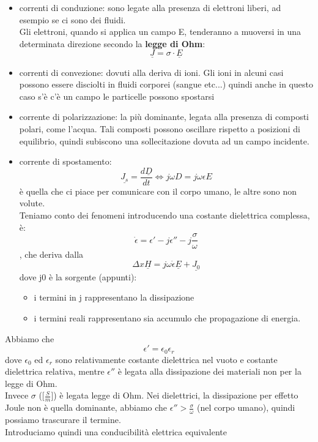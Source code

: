 \documentclass[oneside, 12pt]{extbook}
\begin{document}
\begin{itemize}
	\item correnti di conduzione: sono legate alla presenza di elettroni liberi, ad esempio se ci sono dei fluidi.\\ Gli elettroni, quando si applica un campo E, tenderanno a muoversi in una determinata direzione secondo la \textbf{legge di Ohm}:
	\begin{equation}
		\underline{J} = \sigma \cdot \underline{E}
	\end{equation}
	\item correnti di convezione: dovuti alla deriva di ioni. Gli ioni in alcuni casi possono essere disciolti in fluidi corporei (sangue etc...) quindi anche in questo caso s'è c'è un campo le particelle possono spostarsi
	\item corrente di polarizzazione: la più dominante, legata alla presenza di composti polari, come l'acqua. Tali composti possono oscillare rispetto a posizioni di equilibrio, quindi subiscono una sollecitazione dovuta ad un campo incidente.
	\item corrente di spostamento:
	\begin{equation}
		\underline{J_s} = \frac{d\underline{D}}{dt} \Leftrightarrow j\omega D = j \omega \epsilon E
	\end{equation} è quella che ci piace per comunicare con il corpo umano, le altre sono non volute.\\Teniamo conto dei fenomeni introducendo una costante dielettrica complessa, è:
	\begin{equation}
		\dot{\epsilon} = \epsilon' - j \epsilon'' - j \frac{\sigma}{\omega} 
	\end{equation}, che deriva dalla
	\begin{equation}
	\Delta x \underline{H} = j \omega \dot{\epsilon} \underline{E} + \underline{J_0}
	\end{equation}
	dove j0 è la sorgente (appunti):
	\begin{itemize}
		\item i termini in j rappresentano la dissipazione 
		\item i termini reali rappresentano sia accumulo che propagazione di energia.
	\end{itemize} 
\end{itemize}
Abbiamo che 
\begin{equation}
	\epsilon' = \epsilon_0 \epsilon_r	
\end{equation}
dove $\epsilon_0$ ed $\epsilon_r$ sono relativamente costante dielettrica nel vuoto e costante dielettrica relativa, mentre $\epsilon ''$ è legata alla dissipazione dei materiali non per la legge di Ohm.\\Invece $\sigma$ ([$\frac{S}{m}$]) è legata legge di Ohm. Nei dielettrici, la dissipazione per effetto Joule non è quella dominante, abbiamo che $\epsilon'' > \frac{\sigma}{\omega}$ (nel corpo umano), quindi possiamo trascurare il termine.\\Introduciamo quindi una conducibilità elettrica equivalente
\end{document}
